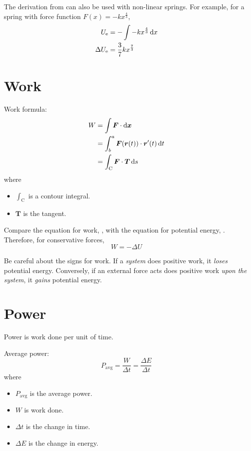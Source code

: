 \documentclass[a4paper, titlepage]{book}
\begin{document}
The derivation from 
can also be used with non-linear springs.
For example, for a spring with force function \(F(x) = -k x^\frac{4}{3}\),
\begin{equation}
    \begin{aligned}
        U_\mathrm{e} &= - \int -k x^\frac{4}{3} \odif{x} \\
        \Delta{U_\mathrm{e}} &= \frac{3}{7} k x^\frac{7}{3}
    \end{aligned}
\end{equation}


\section{Work}

Work formula:
\begin{equation} \label{eq:work}
    \begin{aligned}
        W &= \int \bm{F} \cdot \odif{\bm{x}} \\
        &= \int_{b}^{a} \bm{F}(\bm{r}(t)) \cdot \bm{r}'(t) \odif{t} \\
        &= \int_{\mathrm{C}} \bm{F} \cdot \bm{T} \odif{s}
    \end{aligned}
\end{equation}
where
\begin{itemize}
    \item \(\int_{\mathrm{C}}\) is a contour integral.
    \item \(\bm{T}\) is the tangent.
\end{itemize}

Compare the equation for work, ,
with the equation for potential energy, .
Therefore, for conservative forces,
\begin{equation}
    W = - \Delta{U}
\end{equation}

Be careful about the signs for work.
If a \emph{system} does positive work, it \emph{loses} potential energy.
Conversely, if an external force acts does positive work \emph{upon the system},
it \emph{gains} potential energy.


\section{Power}

Power is work done per unit of time.

Average power:
\begin{equation}
    P_\mathrm{avg} = \frac{W}{\Delta{t}} = \frac{\Delta{E}}{\Delta{t}}
\end{equation}
where
\begin{itemize}
    \item \(P_\mathrm{avg}\) is the average power.
    \item \(W\) is work done.
    \item \(\Delta{t}\) is the change in time.
    \item \(\Delta{E}\) is the change in energy.
\end{itemize}
\end{document}
